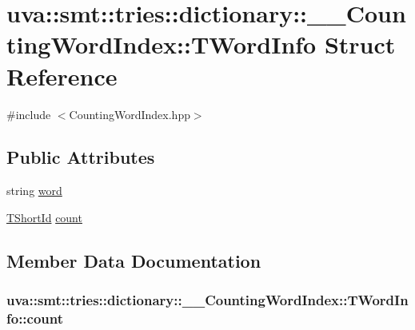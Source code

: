 \hypertarget{structuva_1_1smt_1_1tries_1_1dictionary_1_1_____counting_word_index_1_1_t_word_info}{}\section{uva\+:\+:smt\+:\+:tries\+:\+:dictionary\+:\+:\+\_\+\+\_\+\+Counting\+Word\+Index\+:\+:T\+Word\+Info Struct Reference}
\label{structuva_1_1smt_1_1tries_1_1dictionary_1_1_____counting_word_index_1_1_t_word_info}


{\ttfamily \#include $<$Counting\+Word\+Index.\+hpp$>$}

\subsection*{Public Attributes}
\begin{DoxyCompactItemize}
\item 
string \hyperlink{structuva_1_1smt_1_1tries_1_1dictionary_1_1_____counting_word_index_1_1_t_word_info_a374b184f34abd8935cea6f48fe9560fd}{word}
\item 
\hyperlink{namespaceuva_1_1smt_1_1hashing_adcf22e1982ad09d3a63494c006267469}{T\+Short\+Id} \hyperlink{structuva_1_1smt_1_1tries_1_1dictionary_1_1_____counting_word_index_1_1_t_word_info_ae2d9f670f4efc2d901167fbc91562158}{count}
\end{DoxyCompactItemize}


\subsection{Member Data Documentation}
\hypertarget{structuva_1_1smt_1_1tries_1_1dictionary_1_1_____counting_word_index_1_1_t_word_info_ae2d9f670f4efc2d901167fbc91562158}{}
\subsubsection[{count}]{ uva\+::smt\+::tries\+::dictionary\+::\+\_\+\+\_\+\+Counting\+Word\+Index\+::\+T\+Word\+Info\+::count}\label{structuva_1_1smt_1_1tries_1_1dictionary_1_1_____counting_word_index_1_1_t_word_info_ae2d9f670f4efc2d901167fbc91562158}
\hypertarget{structuva_1_1smt_1_1tries_1_1dictionary_1_1_____counting_word_index_1_1_t_word_info_a374b184f34abd8935cea6f48fe9560fd}{}
